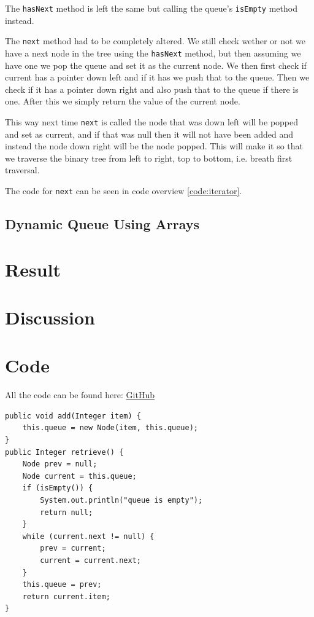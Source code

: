 \documentclass[a4paper,11pt]{article}
\newenvironment{code}{\captionsetup{type=listing}}{}
\begin{document}
The {\tt hasNext} method is left the same but calling the queue's {\tt isEmpty} method instead.

The {\tt next} method had to be completely altered. We still check wether or not we have a next node in the tree using the {\tt hasNext} method, but
then assuming we have one we pop the queue and set it as the current node. We then first check if current has a pointer down left and if it has we push that to
the queue. Then we check if it has a pointer down right and also push that to the queue if there is one. After this we simply return the value of the current node.

This way next time {\tt next} is called the node that was down left will be popped and set as current, and if that was null then it will not have been added and
instead the node down right will be the node popped. This will make it so that we traverse the binary tree from left to right, top to bottom, i.e. breath first
traversal.

The code for {\tt next} can be seen in code overview \ref{code:iterator}.
\subsection{Dynamic Queue Using Arrays}

\section{Result}


\section{Discussion}


\newpage
\FloatBarrier
\section*{Code}
All the code can be found here: \href{https://github.com/adrian-jonsson-sjoedin/ID1021-AlgoData/tree/main/Tasks/Trees/src}{GitHub}

\begin{code}
    \label{code:queueNoLast}
    \begin{verbatim}
public void add(Integer item) {
    this.queue = new Node(item, this.queue);
}
public Integer retrieve() {
    Node prev = null;
    Node current = this.queue;
    if (isEmpty()) {
        System.out.println("queue is empty");
        return null;
    }
    while (current.next != null) {
        prev = current;
        current = current.next;
    }
    this.queue = prev;
    return current.item;
}
\end{verbatim}
\end{code}
\end{document}

